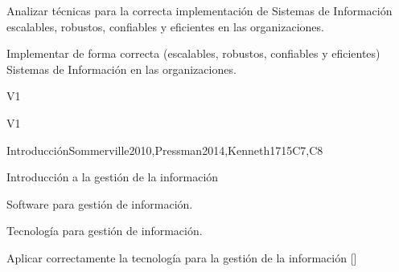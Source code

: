 \begin{syllabus}


\begin{justification}
Analizar técnicas para la correcta implementación de Sistemas de Información escalables, robustos, confiables y eficientes en las organizaciones.
\end{justification}

\begin{goals}
\item Implementar de forma correcta (escalables, robustos, confiables y eficientes) Sistemas de Información en las organizaciones.
\end{goals}

\begin{outcomes}{V1}
    \item {}
    \item {}
    \item {}
\end{outcomes}

\begin{competences}{V1}
    \item {} 
    \item {} 
    \item {} 
    \item {} 
    \item {} 
    \item {} 
\end{competences}

\begin{unit}{Introducción}{}{Sommerville2010,Pressman2014,Kenneth17}{15}{C7,C8}
\begin{topics}
    \item Introducción a la gestión de la información
    \item Software para gestión de información.
    \item Tecnología para gestión de información.
\end{topics}
\begin{learningoutcomes}
    \item Aplicar correctamente la tecnología para la gestión de la información [\Assessment]
\end{learningoutcomes}
\end{unit}


\end{syllabus}
